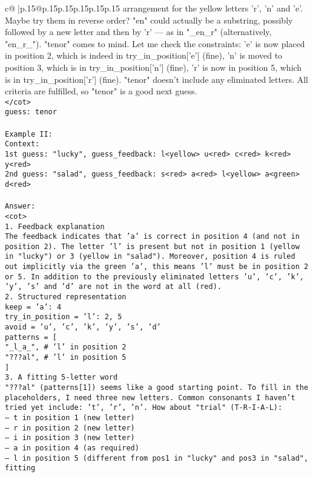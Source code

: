 \documentclass{article}
\begin{document}
{\begin{supertabular}{c@{$\;$}|p{.15\linewidth}@{}p{.15\linewidth}p{.15\linewidth}p{.15\linewidth}p{.15\linewidth}p{.15\linewidth}}
{{{arrangement for the yellow letters 'r', 'n' and 'e'. Maybe try them in reverse order? "en" could actually be a substring, possibly followed by a new letter and then by 'r' — as in "_en_r" (alternatively, "en_r_"). "tenor" comes to mind. Let me check the constraints: 'e' is now placed in position 2, which is indeed in try_in_position['e'] (fine), 'n' is moved to position 3, which is in try_in_position['n'] (fine), 'r' is now in position 5, which is in try_in_position['r'] (fine). "tenor" doesn't include any eliminated letters. All criteria are fulfilled, so "tenor" is a good next guess.\\ \tt </cot>\\ \tt guess: tenor\\ \tt \\ \tt Example II:\\ \tt Context:\\ \tt 1st guess: "lucky", guess_feedback: l<yellow> u<red> c<red> k<red> y<red>\\ \tt 2nd guess: "salad", guess_feedback: s<red> a<red> l<yellow> a<green> d<red>\\ \tt \\ \tt Answer:\\ \tt <cot>\\ \tt 1. Feedback explanation\\ \tt The feedback indicates that 'a' is correct in position 4 (and not in position 2). The letter 'l' is present but not in position 1 (yellow in "lucky") or 3 (yellow in "salad"). Moreover, position 4 is ruled out implicitly via the green 'a', this means 'l' must be in position 2 or 5. In addition to the previously eliminated letters {'u', 'c', 'k', 'y'}, 's' and 'd' are not in the word at all (red).\\ \tt 2. Structured representation\\ \tt keep = {'a': 4}\\ \tt try_in_position = {'l': {2, 5}}\\ \tt avoid = {'u', 'c', 'k', 'y', 's', 'd'}\\ \tt patterns = [\\ \tt     "_l_a_",  # 'l' in position 2\\ \tt     "???al",  # 'l' in position 5\\ \tt ]\\ \tt 3. A fitting 5-letter word\\ \tt "???al" (patterns[1]) seems like a good starting point. To fill in the placeholders, I need three new letters. Common consonants I haven't tried yet include: 't', 'r', 'n'. How about "trial" (T-R-I-A-L):\\ \tt — t in position 1 (new letter)\\ \tt — r in position 2 (new letter)\\ \tt — i in position 3 (new letter)\\ \tt — a in position 4 (as required)\\ \tt — l in position 5 (different from pos1 in "lucky" and pos3 in "salad", fitting }}}
\end{supertabular}}
\end{document}
